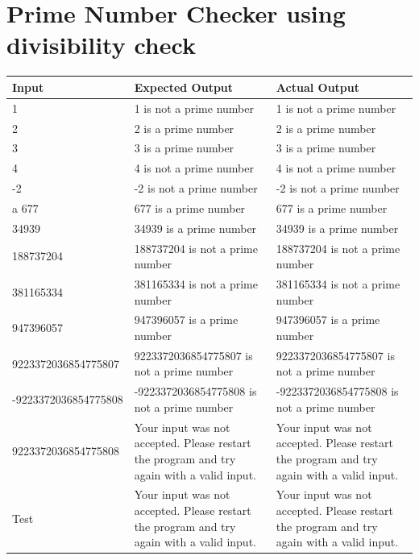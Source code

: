\documentclass[12pt,a4paper,onesided]{report}
\begin{document}
\section{Prime Number Checker using divisibility check}
\begin{table}[h!]
	\centering
\begin{tabular}{lp{30ex}p{30ex}}
	\toprule Input & Expected Output & Actual Output\\
	\midrule
	1 & 1 is not a prime number& 1 is not a prime number\\
	2 & 2 is a prime number & 2 is a prime number\\
	3 & 3 is a prime number & 3 is a prime number\\
	4 & 4 is not a prime number & 4 is not a prime number\\
	-2 & -2 is not a prime number & -2 is not a prime number\\a
	677 & 677 is a prime number & 677 is a prime number\\
	34939 & 34939 is a prime number & 34939 is a prime number\\
	188737204 & 188737204 is not a prime number & 188737204 is not a prime number\\
	381165334 & 381165334 is not a prime number & 381165334 is not a prime number\\
	947396057 & 947396057 is a prime number & 947396057 is a prime number\\
	9223372036854775807 & 9223372036854775807 is not a prime number & 9223372036854775807 is not a prime number\\
	-9223372036854775808 & -9223372036854775808 is not a prime number &-9223372036854775808 is not a prime number\\
	9223372036854775808 & Your input was not accepted. Please restart the program and try again with a valid input. & Your input was not accepted. Please restart the program and try again with a valid input.\\
	Test & Your input was not accepted. Please restart the program and try again with a valid input. & Your input was not accepted. Please restart the program and try again with a valid input.\\
	
	\bottomrule
	\end{tabular}
\end{table}
\newpage
\end{document}
